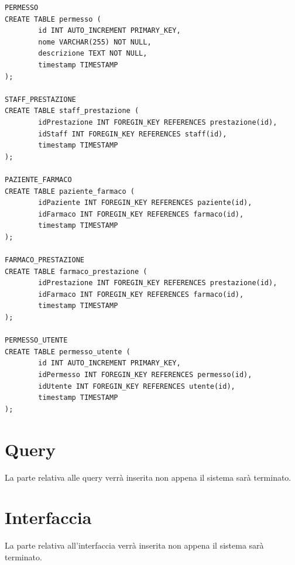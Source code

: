 \documentclass[paper=a4, fontsize=11pt,x11names]{report}
\begin{document}
\begin{verbatim}
PERMESSO
CREATE TABLE permesso (
        id INT AUTO_INCREMENT PRIMARY_KEY,
        nome VARCHAR(255) NOT NULL,
        descrizione TEXT NOT NULL,
        timestamp TIMESTAMP
);

STAFF_PRESTAZIONE
CREATE TABLE staff_prestazione (
        idPrestazione INT FOREGIN_KEY REFERENCES prestazione(id),
        idStaff INT FOREGIN_KEY REFERENCES staff(id),
        timestamp TIMESTAMP
);

PAZIENTE_FARMACO
CREATE TABLE paziente_farmaco (
        idPaziente INT FOREGIN_KEY REFERENCES paziente(id),
        idFarmaco INT FOREGIN_KEY REFERENCES farmaco(id),
        timestamp TIMESTAMP
);

FARMACO_PRESTAZIONE
CREATE TABLE farmaco_prestazione (
        idPrestazione INT FOREGIN_KEY REFERENCES prestazione(id),
        idFarmaco INT FOREGIN_KEY REFERENCES farmaco(id),
        timestamp TIMESTAMP
);

PERMESSO_UTENTE
CREATE TABLE permesso_utente (
 		id INT AUTO_INCREMENT PRIMARY_KEY,
        idPermesso INT FOREGIN_KEY REFERENCES permesso(id),
        idUtente INT FOREGIN_KEY REFERENCES utente(id),
        timestamp TIMESTAMP
);

\end{verbatim}

\chapter{Query}
La parte relativa alle query verrà inserita non appena il sistema sarà terminato.

\chapter{Interfaccia}
La parte relativa all'interfaccia verrà inserita non appena il sistema sarà terminato.



\end{document}
